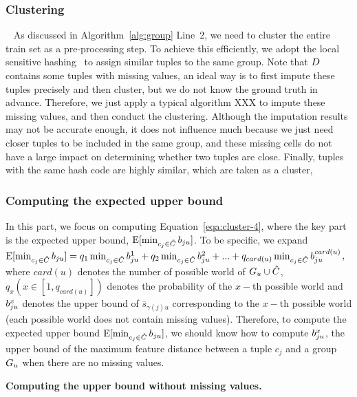 \subsubsection{Clustering}~\label{subsec:clustering}
As discussed in Algorithm~\ref{alg:group} Line~2, we need to cluster the entire train set as a pre-processing step. To achieve this efficiently, we adopt the local sensitive hashing~\cite{} to assign similar tuples to the same group. 
%
Note that $D$ contains some tuples with missing values, an ideal way is to first impute these tuples precisely and then cluster, but we do not know the ground truth in advance. Therefore, we just apply a typical algorithm \ie XXX to impute these missing values, and then conduct the clustering. Although the imputation results may  not be accurate enough, it does not influence much because we just need closer tuples to be included in the same group, and these missing cells do not have a large impact on determining whether two tuples are close. 
%
Finally, tuples with the same hash code are highly similar, which are taken as a cluster,
%
 


\subsubsection{Computing the expected upper bound} In this part, we focus on computing Equation~\ref{eqa:cluster-4}, where the key part is the expected upper bound, \ie $\mathrm{E}[\min_{c_j\in \hat{C}}b_{ju}]$. To be specific, we expand $\mathrm{E}[\min_{c_j\in \hat{C}}b_{ju}] = q_1\min_{c_j\in \hat{C}}b_{ju}^1 + q_2\min_{c_j\in \hat{C}}b_{ju}^2 + ... +q_{card(u)}\min_{c_j\in \hat{C}}b_{ju}^{card(u)}$, where $card(u)$ denotes the number of possible world of $G_u \cup \hat{C}$, $q_x    (x\in [1, q_{card(u)}])$ denotes the probability of the $x-$th possible world and  $b_{ju}^x$ denotes the upper bound of $\overline{s}_{\gamma(j)u}$ corresponding to the $x-$th possible world (each possible world does not contain missing values). 
%
Therefore, to compute the expected upper bound $\mathrm{E}[\min_{c_j\in \hat{C}}b_{ju}]$, we should know how to compute $b_{ju}^x$, \ie the upper bound of the maximum feature distance between a tuple $c_j$ and a group $G_u$ when there are no missing values.

\noindent \textbf{Computing the upper bound without missing values.} 




